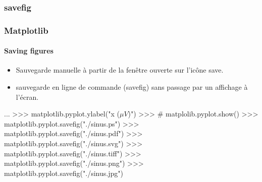 \subsubsection{savefig}
\begin{frame}[fragile]
\frametitle{Matplotlib}
\framesubtitle{Saving figures}
\begin{itemize}
 \item Sauvegarde manuelle à partir de la fenêtre ouverte sur l'icône save.  
 \item sauvegarde en ligne de commande (savefig) sans passage par un affichage à l'écran.  
\end{itemize}
\begin{pythonConsole}
...
>>> matplotlib.pyplot.ylabel("x ($\mu V$)")
>>> # matplolib.pyplot.show()
>>> matplotlib.pyplot.savefig("./sinus.ps")
>>> matplotlib.pyplot.savefig("./sinus.pdf")
>>> matplotlib.pyplot.savefig("./sinus.svg")
>>> matplotlib.pyplot.savefig("./sinus.tiff")
>>> matplotlib.pyplot.savefig("./sinus.png")
>>> matplotlib.pyplot.savefig("./sinus.jpg")
\end{pythonConsole}
\end{frame}

